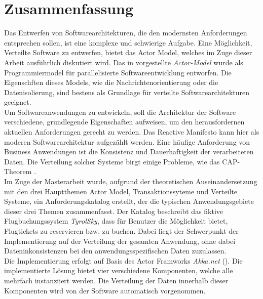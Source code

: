 \chapter*{Zusammenfassung}
Das Entwerfen von Softwarearchitekturen, die den modernsten Anforderungen entsprechen sollen, ist eine komplexe und schwierige Aufgabe. Eine Möglichkeit, Verteilte Software zu entwerfen, bietet das Actor Model, welches im Zuge dieser Arbeit ausführlich diskutiert wird. Das in \cite{Hewitt1973AIntelligence} vorgestellte \textit{Actor-Model} wurde als Programmiermodel für parallelisierte Softwareentwicklung entworfen. Die Eigenschften dieses Models, wie die Nachrichtenorientierung oder die Datenisolierung, sind bestens als Grundlage für verteilte Softwarearchitekturen geeignet. \\
Um Softwareanwendungen zu entwickeln, soll die Architektur der Software verschiedene, grundlegende Eigenschaften aufweisen, um den herausfordernen aktuellen Anforderungen gerecht zu werden. Das Reactive Manifesto kann hier als moderen Softwarearchitektur aufgezählt werden.
Eine häufige Anforderung von Business Anwendungen ist die Konsistenz und Dauerhaftigkeit der verarbeiteten Daten. Die Verteilung solcher Systeme birgt einige Probleme, wie das CAP-Theorem \citep{gilbertPerspectiveCAPTheorem2012}. \\
Im Zuge der Masterarbeit wurde, aufgrund der theoretischen Auseinandersetzung mit den drei Hauptthemen Actor Model, Transaktionssyteme und Verteilte Systeme, ein Anforderungskatalog erstellt, der die typischen Anwendungsgebiete dieser drei Themen zusammenfasst. Der Katalog beschreibt das fiktive Flugbuchungssystem \textit{TyrolSky}, dass für Benutzer die Möglichkeit bietet, Flugtickets zu reservieren bzw. zu buchen. Dabei liegt der Schwerpunkt der Implementierung auf der Verteilung der gesamten Anwendung, ohne dabei Dateninkonsistenzen bei den anwendungsspezifischen Daten zuzulassen. \\
Die Implementierung erfolgt auf Basis des Actor Framworks \textit{Akka.net} (\cite{Akka.netCommunityAkka.NETDocumentation}). Die implementierte Lösung bietet vier verschiedene Komponenten, welche alle mehrfach instanziiert werden. Die Verteilung der Daten innerhalb dieser Komponenten wird von der Software automatisch vorgenommen.

\cleardoublepage
